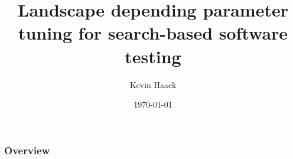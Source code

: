\documentclass[aspectratio=169]{beamer}
\title{Landscape depending parameter
tuning for search-based software testing}
\subtitle{}
\author{Kevin Haack}
\institute{Software Engineering}
\date{\today}
\begin{document}
	
{
	\hnititlebackground 
	\begin{frame}
		\titlepage
	\end{frame}
}

{
	\begin{frame}
		\frametitle{Overview}
		\tableofcontents
	\end{frame}
}





{
	\hnifullbackground 
	
	\begin{frame}
		\textbf{\Huge{\centerline{}}}
	\end{frame}
}
\end{document}
